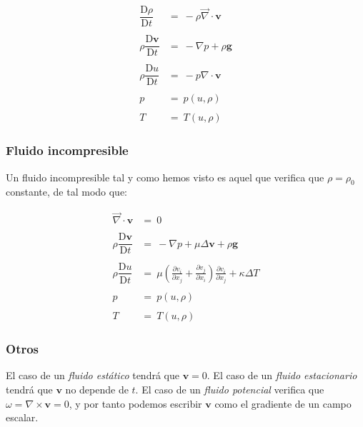 \documentclass[12pt,a4paper]{article}
\numberwithin{equation}{section}
\numberwithin{figure}{section}
\newcommand{\parentesis}[1]{\left( #1  \right)}
\newcommand{\parciales}[2]{\frac{\partial #1}{\partial #2}}
\newcommand{\Dd}{\mathrm{D}}
\newcommand{\rota}{\nabla \times}
\newcommand{\vn}{\mathbf{v}}
\newcommand{\gn}{\mathbf{g}}
\begin{document}
\begin{equation}
\begin{array}{rl}
\dfrac{\Dd \rho}{\Dd t} & =  \ - \rho \vec{\nabla} \cdot \vn \\ \\
\rho \dfrac{\Dd \vn}{\Dd t}  & = \  - \nabla p + \rho \gn \\ \\
\rho \dfrac{\Dd u}{\Dd t} &  = \ - p \nabla \cdot \vn  \\ \\
p  & = \  p(u,\rho) \\ \\
T & =  \ T(u,\rho) 
\end{array}
\end{equation}


\subsubsection{Fluido incompresible}

Un fluido incompresible tal y como hemos visto es aquel que verifica que $\rho = \rho_0$ constante, de tal modo que:


\begin{equation}
\begin{array}{rl}
 \vec{\nabla} \cdot \vn & = \ 0 \\ \\
\rho \dfrac{\Dd \vn}{\Dd t}  & = \  - \nabla p +  \mu \Delta \vn + \rho \gn \\ \\
\rho \dfrac{\Dd u}{\Dd t} &  = \  \mu \parentesis{\parciales{v_i}{x_j} + \parciales{v_j}{x_i}} \parciales{v_i}{x_j} + \kappa \Delta T \\ \\
p  & = \  p(u,\rho) \\ \\
T & =  \ T(u,\rho) 
\end{array}
\end{equation}

\subsubsection{Otros}

El caso de un \textit{fluido estático} tendrá que $\vn = 0$. El caso de un \textit{fluido estacionario} tendrá que $\vn$ no depende de $t$. El caso de un \textit{fluido potencial} verifica que $\omega = \rota \vn = 0$, y por tanto podemos escribir $\vn$ como el gradiente de un campo escalar.
\end{document}
